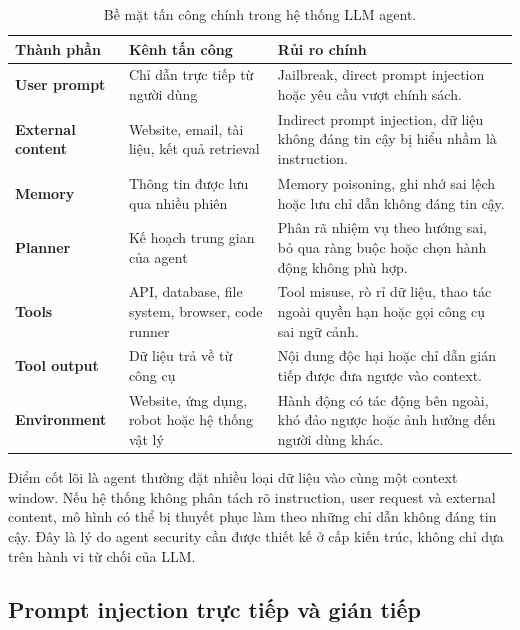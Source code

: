 \begin{table}[H]
\centering
\caption{Bề mặt tấn công chính trong hệ thống LLM agent.}
\label{tab:agent-attack-surface}
\begin{tabularx}{\textwidth}{
    >{\bfseries}p{}
    p{}
    X
}
\toprule
Thành phần
& Kênh tấn công
& Rủi ro chính \\
\midrule

User prompt
& Chỉ dẫn trực tiếp từ người dùng
& Jailbreak, direct prompt injection hoặc yêu cầu vượt chính sách. \\

External content
& Website, email, tài liệu, kết quả retrieval
& Indirect prompt injection, dữ liệu không đáng tin cậy bị hiểu nhầm là
instruction. \\

Memory
& Thông tin được lưu qua nhiều phiên
& Memory poisoning, ghi nhớ sai lệch hoặc lưu chỉ dẫn không đáng tin cậy. \\

Planner
& Kế hoạch trung gian của agent
& Phân rã nhiệm vụ theo hướng sai, bỏ qua ràng buộc hoặc chọn hành động
không phù hợp. \\

Tools
& API, database, file system, browser, code runner
& Tool misuse, rò rỉ dữ liệu, thao tác ngoài quyền hạn hoặc gọi công cụ sai
ngữ cảnh. \\

Tool output
& Dữ liệu trả về từ công cụ
& Nội dung độc hại hoặc chỉ dẫn gián tiếp được đưa ngược vào context. \\

Environment
& Website, ứng dụng, robot hoặc hệ thống vật lý
& Hành động có tác động bên ngoài, khó đảo ngược hoặc ảnh hưởng đến người
dùng khác. \\

\bottomrule
\end{tabularx}
\end{table}

Điểm cốt lõi là agent thường đặt nhiều loại dữ liệu vào cùng một context
window. Nếu hệ thống không phân tách rõ instruction, user request và
external content, mô hình có thể bị thuyết phục làm theo những chỉ dẫn
không đáng tin cậy. Đây là lý do agent security cần được thiết kế ở cấp
kiến trúc, không chỉ dựa trên hành vi từ chối của LLM.

\subsection{Prompt injection trực tiếp và gián tiếp}
\label{subsec:direct-indirect-prompt-injection}

